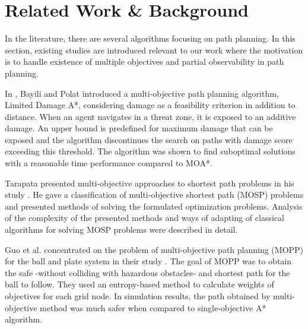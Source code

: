 \documentclass[10pt,journal]{IEEEtran}
\begin{document}
\section{Related Work \& Background}
\label{chapter:relatedwork}

In the literature, there are several algorithms focusing on path planning. In this section, existing studies are introduced relevant to our work where the motivation is to handle existence of multiple objectives and partial observability in path planning.

In  \cite{LDAStarBayili:2008}, Bayili and Polat introduced a multi-objective path planning algorithm, Limited Damage A*,  considering damage as a feasibility criterion in addition to distance. When an agent navigates in a threat zone, it is exposed to an additive damage. An upper bound is predefined for maximum damage that can be exposed and the algorithm discontinues the search on paths with damage score exceeding this threshold. The algorithm was shown to find suboptimal solutions with a reasonable time performance compared to MOA*.

Tarapata presented multi-objective approaches to shortest path problems in his study \cite{Tarapata:2007}. He gave a classification of multi-objective shortest path (MOSP) problems and presented methods of solving the formulated optimization problems. Analysis of the complexity of the presented methods and ways of adapting of classical algorithms for solving MOSP problems were described in detail.

Guo et al. concentrated on the problem of multi-objective path planning (MOPP) for the ball and plate system in their study \cite{Guo:2009}. The goal of MOPP was to obtain the safe -without colliding with hazardous obstacles- and shortest path for the ball to follow. They used an entropy-based method to calculate weights of objectives for each grid node. In simulation results, the path obtained by multi-objective method was much safer when compared to single-objective A* algorithm.
\end{document}
